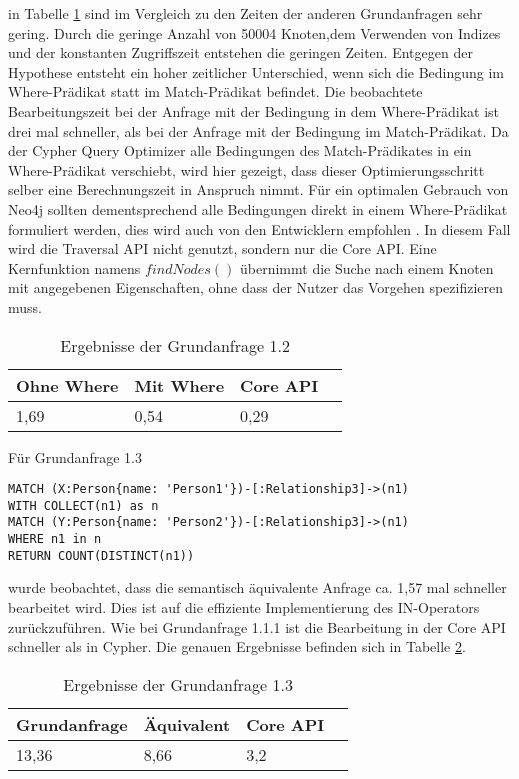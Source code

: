   in Tabelle \ref{tab:Query1_2} sind im Vergleich zu den Zeiten der anderen Grundanfragen sehr gering. Durch die geringe Anzahl von 50004 Knoten,dem Verwenden von Indizes und der konstanten Zugriffszeit entstehen die geringen Zeiten. \newline Entgegen der Hypothese entsteht ein hoher zeitlicher Unterschied, wenn sich die Bedingung im Where-Prädikat statt im Match-Prädikat 	befindet. Die beobachtete Bearbeitungszeit bei der Anfrage mit der Bedingung in dem Where-Prädikat ist drei mal schneller, als bei der Anfrage mit der Bedingung im Match-Prädikat. Da der Cypher Query Optimizer alle Bedingungen des Match-Prädikates in ein Where-Prädikat verschiebt, wird hier gezeigt, dass dieser Optimierungsschritt selber eine  Berechnungszeit in Anspruch nimmt. Für ein optimalen Gebrauch von Neo4j sollten dementsprechend alle Bedingungen direkt in einem Where-Prädikat formuliert werden, dies wird auch von den Entwicklern empfohlen \parencite{Optimizer}. \newline
In diesem Fall wird die Traversal API nicht genutzt, sondern nur die Core API. Eine Kernfunktion namens $findNodes()$ übernimmt die Suche nach einem Knoten mit angegebenen Eigenschaften, ohne dass der Nutzer das Vorgehen spezifizieren muss.  
\FloatBarrier
\begin{table}[h]
	\centering
		\begin{tabular}{ |p{3cm}|p{3cm}|p{3cm}|p{3cm}|  }
			\hline
			Ohne Where& Mit Where& Core API  \\
			\hline
			1,69   &  0,54  & 0,29  \\
			\hline
		\end{tabular}
		\FloatBarrier
		\caption{Ergebnisse der Grundanfrage 1.2}
		\label{tab:Query1_2}
\end{table}
 \vskip 2.5cm
\noindent Für Grundanfrage 1.3
\begin{Verbatim}[frame=single]
MATCH (X:Person{name: 'Person1'})-[:Relationship3]->(n1) 
WITH COLLECT(n1) as n 
MATCH (Y:Person{name: 'Person2'})-[:Relationship3]->(n1) 
WHERE n1 in n
RETURN COUNT(DISTINCT(n1))
\end{Verbatim} 
 wurde beobachtet, dass die semantisch äquivalente Anfrage ca. 1,57 mal schneller bearbeitet wird. Dies ist auf die effiziente Implementierung des IN-Operators zurückzuführen. Wie bei Grundanfrage 1.1.1 ist die Bearbeitung in der Core API schneller als in Cypher.
Die genauen Ergebnisse befinden sich in Tabelle	\ref{tab:Query1_3}.
\FloatBarrier
\begin{table}[h]
	\centering
		\begin{tabular}{ |p{3cm}|p{3cm}|p{3cm}|p{3cm}|  }
			\hline
			Grundanfrage & Äquivalent&Core API\\
			\hline
			 13,36    & 8,66 &  3,2\\
			\hline
		\end{tabular}
		\caption{Ergebnisse der Grundanfrage 1.3}
		\label{tab:Query1_3}
\end{table}
\FloatBarrier

